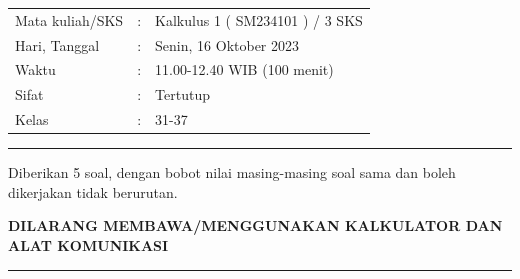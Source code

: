 \documentclass[10pt,openany,a4paper]{article}
\begin{document}
    \begin{center}
	\begin{tabular}{lcl}
		Mata kuliah/SKS & : & Kalkulus 1 ( SM234101 ) / 3 SKS\\
		Hari, Tanggal & : & Senin, 16 Oktober 2023\\
		Waktu & : & 11.00-12.40 WIB (100 menit)\\
		Sifat & : & Tertutup\\
		Kelas & : & 31-37
	\end{tabular}
    \end{center}
	
    \noindent\rule{\textwidth}{2.pt}
	
    \setlength{\parindent}{5pt}
    \par Diberikan 5 soal, dengan bobot nilai masing-masing soal sama dan boleh dikerjakan tidak berurutan.
    \setlength{\parindent}{5pt}
    \setlength{\parindent}{5pt}
    {\small
    \par \textbf{\MakeUppercase{Dilarang membawa/menggunakan kalkulator dan alat komunikasi}}
    }
    \par {}
	
    \noindent\rule{\textwidth}{2.pt}
	
\end{document}
